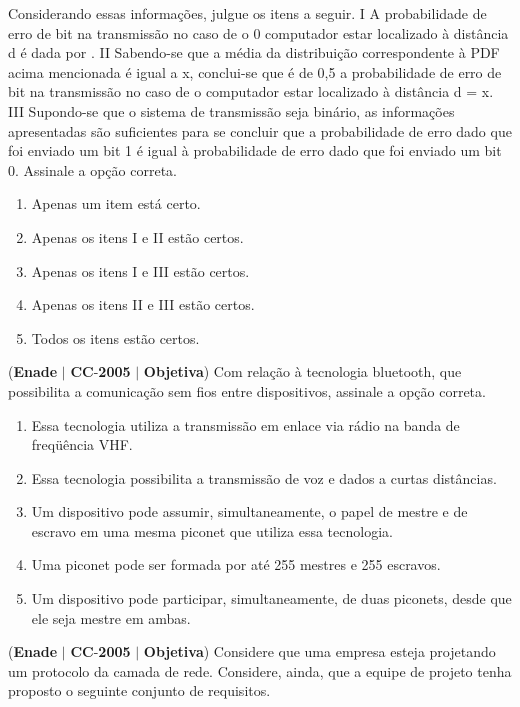 \documentclass{exam}
\begin{document}
\begin{questions}
Considerando essas informações, julgue os itens a seguir.
I A probabilidade de erro de bit na transmissão no caso de o
0
computador estar localizado à distância d é dada
por .
II Sabendo-se que a média da distribuição correspondente
à PDF acima mencionada é igual a x, conclui-se que é de
0,5 a probabilidade de erro de bit na transmissão no caso
de o computador estar localizado à distância d = x.
III Supondo-se que o sistema de transmissão seja binário, as
informações apresentadas são suficientes para se
concluir que a probabilidade de erro dado que foi enviado
um bit 1 é igual à probabilidade de erro dado que foi
enviado um bit 0.
Assinale a opção correta.
	\begin{enumerate}[label=\alph*)]
		\item  Apenas um item está certo.
		\item  Apenas os itens I e II estão certos.
		\item  Apenas os itens I e III estão certos.
		\item  Apenas os itens II e III estão certos.
		\item  Todos os itens estão certos.
	\end{enumerate}

\question (\textbf{Enade} $|$ \textbf{CC}-\textbf{2005} $|$ \textbf{Objetiva})
Com relação à tecnologia bluetooth, que possibilita a
comunicação sem fios entre dispositivos, assinale a opção
correta.
	\begin{enumerate}[label=\alph*)]
		\item  Essa tecnologia utiliza a transmissão em enlace via rádio na
banda de freqüência VHF.
		\item  Essa tecnologia possibilita a transmissão de voz e dados a
curtas distâncias.
		\item  Um dispositivo pode assumir, simultaneamente, o papel de
mestre e de escravo em uma mesma piconet que utiliza essa
tecnologia.
		\item  Uma piconet pode ser formada por até 255 mestres e
255 escravos.
		\item  Um dispositivo pode participar, simultaneamente, de duas
piconets, desde que ele seja mestre em ambas.
	\end{enumerate}

\question (\textbf{Enade} $|$ \textbf{CC}-\textbf{2005} $|$ \textbf{Objetiva})
Considere que uma empresa esteja projetando um protocolo da camada de rede. Considere, ainda, que a equipe de projeto tenha
proposto o seguinte conjunto de requisitos.


\end{questions}
\end{document}
